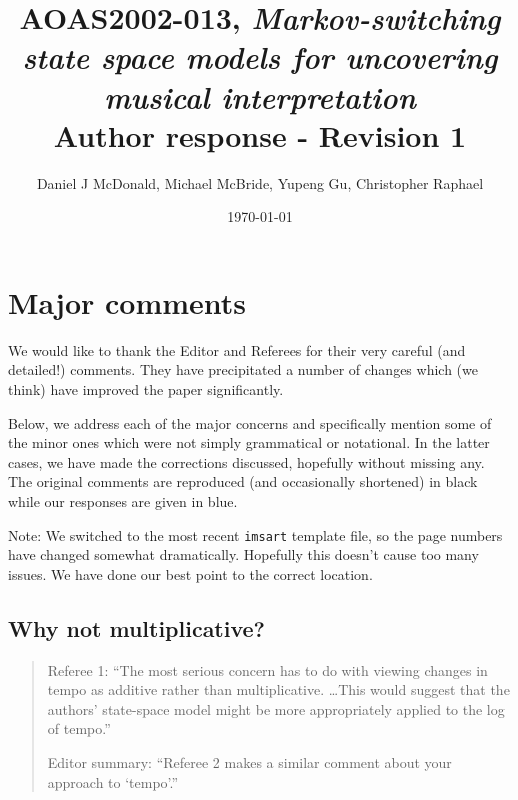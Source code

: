 \documentclass[12pt]{article}
\title{AOAS2002-013, \emph{Markov-switching state space models for uncovering
    musical interpretation} \\
Author response - Revision 1}
\author{Daniel J McDonald, Michael McBride, Yupeng Gu, Christopher Raphael}
\date{\today}
\begin{document}
\maketitle

\section*{Major comments}


We would like to thank the Editor and Referees for their very careful (and detailed!)
comments. They have precipitated a number of changes which (we think) have
improved the paper significantly. 

Below, we address each of the major concerns and specifically mention
some of the minor ones which were not simply grammatical or
notational. In the latter cases, we have made the corrections
discussed, hopefully without missing any. The original comments are
reproduced (and occasionally shortened) in black while our responses are given in \textcolor{cobalt}{blue}.


Note: We switched to the most recent \texttt{imsart} template file, so the page numbers have changed somewhat dramatically. Hopefully this doesn't cause too many issues. We have done our best point to the correct location.



\subsection*{Why not multiplicative?}

\begin{quote}
Referee 1: ``The most serious concern has to do with viewing changes in tempo as additive rather than multiplicative. \ldots This would suggest that the authors’ state-space model might be more appropriately applied to the log of tempo.''

Editor summary: ``Referee 2 makes a similar comment about your approach to `tempo'.''
\end{quote}
\end{document}
